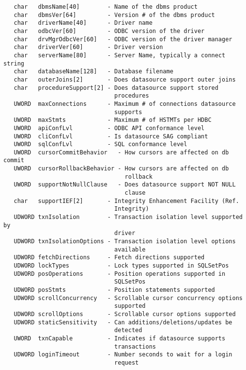 \begin{verbatim}
   char   dbmsName[40]        - Name of the dbms product
   char   dbmsVer[64]         - Version # of the dbms product
   char   driverName[40]      - Driver name
   char   odbcVer[60]         - ODBC version of the driver
   char   drvMgrOdbcVer[60]   - ODBC version of the driver manager
   char   driverVer[60]       - Driver version
   char   serverName[80]      - Server Name, typically a connect string
   char   databaseName[128]   - Database filename
   char   outerJoins[2]       - Does datasource support outer joins
   char   procedureSupport[2] - Does datasource support stored 
                                procedures
   UWORD  maxConnections      - Maximum # of connections datasource 
                                supports
   UWORD  maxStmts            - Maximum # of HSTMTs per HDBC
   UWORD  apiConfLvl          - ODBC API conformance level
   UWORD  cliConfLvl          - Is datasource SAG compliant
   UWORD  sqlConfLvl          - SQL conformance level
   UWORD  cursorCommitBehavior   - How cursors are affected on db commit
   UWORD  cursorRollbackBehavior - How cursors are affected on db 
                                   rollback
   UWORD  supportNotNullClause   - Does datasource support NOT NULL 
                                   clause
   char   supportIEF[2]       - Integrity Enhancement Facility (Ref. 
                                Integrity)
   UDWORD txnIsolation        - Transaction isolation level supported by
                                driver
   UDWORD txnIsolationOptions - Transaction isolation level options 
                                available
   UDWORD fetchDirections     - Fetch directions supported
   UDWORD lockTypes           - Lock types supported in SQLSetPos
   UDWORD posOperations       - Position operations supported in 
                                SQLSetPos
   UDWORD posStmts            - Position statements supported
   UDWORD scrollConcurrency   - Scrollable cursor concurrency options 
                                supported
   UDWORD scrollOptions       - Scrollable cursor options supported
   UDWORD staticSensitivity   - Can additions/deletions/updates be 
                                detected
   UWORD  txnCapable          - Indicates if datasource supports 
                                transactions
   UDWORD loginTimeout        - Number seconds to wait for a login 
                                request
\end{verbatim}


